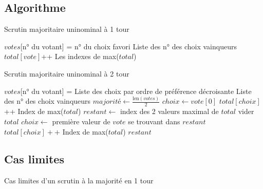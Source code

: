 \documentclass[../report]{subfiles}
\begin{document}
  \subsection{Algorithme}

  \begin{algorithm}[H]
  \caption{Scrutin majoritaire uninominal à 1 tour}
  \label{scrutin:maj-uni-1t}
  \begin{algorithmic}[1]
  \REQUIRE $votes$[n° du votant] = n° du choix favori
  \ENSURE Liste des n° des choix vainqueurs
  \STATE $total[vote]$++
  \ENDFOR
  \RETURN Les indexes de max($total$)
  \end{algorithmic}
  \end{algorithm}
  
  \begin{algorithm}[H]
  \caption{Scrutin majoritaire uninominal à 2 tour}
  \label{scrutin:maj-uni-2t}
  \begin{algorithmic}[1]
  \REQUIRE $votes$[n° du votant] = Liste des choix par ordre de préférence décroisante
  \ENSURE Liste des n° des choix vainqueurs
  \STATE $majorité \leftarrow \frac{\text{len}(votes)}{2} $
    \STATE $choix \leftarrow vote[0]$ 
    \STATE $total[choix]$++
  \ENDFOR
    \RETURN Index de max($total$)
  \ENDIF
  \STATE
  \STATE $restant \leftarrow $ index des 2 valeurs maximal de $total$
  \STATE vider $total$
    \STATE $choix \leftarrow $ première valeur de $vote$ se trouvant dans $restant$
    \STATE $total[choix]++$
  \ENDFOR
    \RETURN Index de max($total$)
  \ELSE
    \STATE {}
    \RETURN $restant$
  \ENDIF
  \end{algorithmic}
  \end{algorithm}

  \subsection{Cas limites}

  \begin{table}[H]
    \begin{center}
      \caption{Cas limites d'un scrutin à la majorité en 1 tour}
      \label{fig:diff:maj1:caslim1}
    \end{center}
  \end{table}
\end{document}
